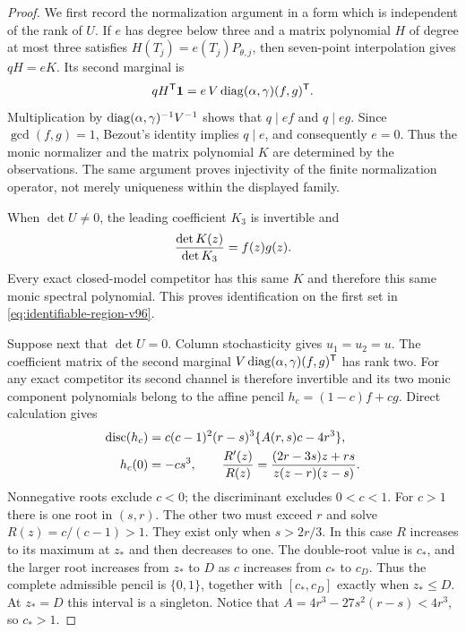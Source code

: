 \begin{proof}
We first record the normalization argument in a form which is independent
of the rank of $U$. If $e$ has degree below three and a matrix polynomial
$H$ of degree at most three satisfies $H(T_j)=e(T_j)P_{\theta,j}$,
then seven-point interpolation gives $qH=eK$. Its second marginal is
\[
 qH^{\mathsf T}\mathbf 1=e\,V\operatorname{diag}(\alpha,\gamma)(f,g)^{\mathsf T}.
\]
Multiplication by $\operatorname{diag}(\alpha,\gamma)^{-1}V^{-1}$ shows that
$q\mid ef$ and $q\mid eg$. Since $\gcd(f,g)=1$, Bezout's identity
implies $q\mid e$, and consequently $e=0$. Thus the monic normalizer
and the matrix polynomial $K$ are determined by the observations.
The same argument proves injectivity of the finite normalization
operator, not merely uniqueness within the displayed family.

When $\det U\ne0$, the leading coefficient $K_3$ is invertible and
\[
 {\det K(z)\over\det K_3}=f(z)g(z).
\]
Every exact closed-model competitor has this same $K$ and therefore
this same monic spectral polynomial. This proves identification on the
first set in \eqref{eq:identifiable-region-v96}.

Suppose next that $\det U=0$. Column stochasticity gives $u_1=u_2=u$.
The coefficient matrix of the second marginal
$V\operatorname{diag}(\alpha,\gamma)(f,g)^{\mathsf T}$ has rank two. For any exact
competitor its second channel is therefore invertible and its two
monic component polynomials belong to the affine pencil
$h_c=(1-c)f+cg$. Direct calculation gives
\begin{align*}
 \operatorname{disc}(h_c)
 &=c(c-1)^2(r-s)^3\{A(r,s)c-4r^3\},\\
 h_c(0)&=-cs^3,\qquad
 {R'(z)\over R(z)}={(2r-3s)z+rs\over z(z-r)(z-s)}.
\end{align*}
Nonnegative roots exclude $c<0$; the discriminant excludes $0<c<1$.
For $c>1$ there is one root in $(s,r)$. The other two must exceed $r$
and solve $R(z)=c/(c-1)>1$. They exist only when $s>2r/3$.
In this case $R$ increases to its maximum at $z_*$ and then decreases
to one. The double-root value is $c_*$, and the larger root increases
from $z_*$ to $D$ as $c$ increases from $c_*$ to $c_D$.
Thus the complete admissible pencil is $\{0,1\}$, together with
$[c_*,c_D]$ exactly when $z_*\le D$. At $z_*=D$ this interval is a
singleton. Notice that $A=4r^3-27s^2(r-s)<4r^3$, so $c_*>1$.


\end{proof}
